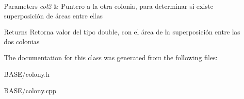 \begin{DoxyParams}{Parameters}
{\em col2} & Puntero a la otra colonia, para determinar si existe superposición de áreas entre ellas\\
\hline
\end{DoxyParams}
\begin{DoxyReturn}{Returns}
Retorna valor del tipo double, con el área de la superposición entre las dos colonias 
\end{DoxyReturn}


The documentation for this class was generated from the following files\+:\begin{DoxyCompactItemize}
\item 
B\+A\+S\+E/colony.\+h\item 
B\+A\+S\+E/colony.\+cpp\end{DoxyCompactItemize}
